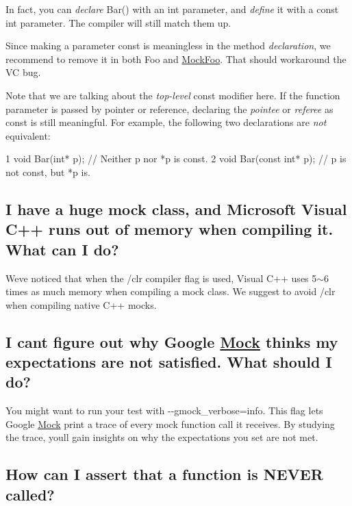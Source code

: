 In fact, you can {\itshape declare} Bar() with an {\ttfamily int} parameter, and {\itshape define} it with a {\ttfamily const int} parameter. The compiler will still match them up.

Since making a parameter {\ttfamily const} is meaningless in the method {\itshape declaration}, we recommend to remove it in both {\ttfamily Foo} and {\ttfamily \hyperlink{classMockFoo}{Mock\+Foo}}. That should workaround the VC bug.

Note that we are talking about the {\itshape top-\/level} {\ttfamily const} modifier here. If the function parameter is passed by pointer or reference, declaring the {\itshape pointee} or {\itshape referee} as {\ttfamily const} is still meaningful. For example, the following two declarations are {\itshape not} equivalent\+: 
\begin{DoxyCode}
1 void Bar(int* p);        // Neither p nor *p is const.
2 void Bar(const int* p);  // p is not const, but *p is.
\end{DoxyCode}


\subsection*{I have a huge mock class, and Microsoft Visual C++ runs out of memory when compiling it. What can I do?}

We\textquotesingle{}ve noticed that when the {\ttfamily /clr} compiler flag is used, Visual C++ uses 5$\sim$6 times as much memory when compiling a mock class. We suggest to avoid {\ttfamily /clr} when compiling native C++ mocks.

\subsection*{I can\textquotesingle{}t figure out why Google \hyperlink{classMock}{Mock} thinks my expectations are not satisfied. What should I do?}

You might want to run your test with {\ttfamily -\/-\/gmock\+\_\+verbose=info}. This flag lets Google \hyperlink{classMock}{Mock} print a trace of every mock function call it receives. By studying the trace, you\textquotesingle{}ll gain insights on why the expectations you set are not met.

\subsection*{How can I assert that a function is N\+E\+V\+ER called?}


